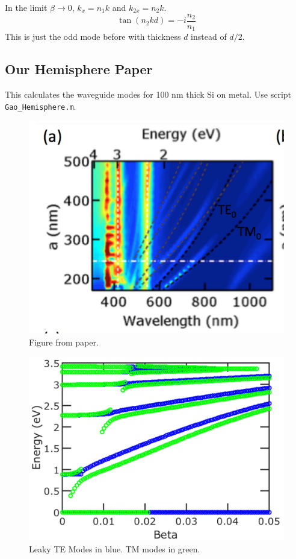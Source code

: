 \documentclass[12pt]{article}
\numberwithin{equation}{section}
\begin{document}
In the limit $\beta \rightarrow 0$, $k_x = n_1 k$ and $k_{2x} = n_2 k$.
\begin{equation}
\boxed{\tan (n_2 k d) = - i \frac{n_2}{n_1} }
\end{equation}
This is just the odd mode before with thickness $d$ instead of $d/2$.  

\subsection{Our Hemisphere Paper}

This calculates the waveguide modes for 100 nm thick Si on metal.
Use script \texttt{Gao\_Hemisphere.m}.

\begin{figure}[H]
\centering 
\vspace{-10pt}
\includegraphics[scale=.4]{Figures/HemispherePaperFigure}
\caption{Figure from paper.}
\vspace{-10pt}
\end{figure}

\begin{figure}[H]
\centering 
\includegraphics[scale=.4]{Figures/HemispherePaper}
\caption{Leaky TE Modes in blue.  TM modes in green.}
\end{figure}
\end{document}
